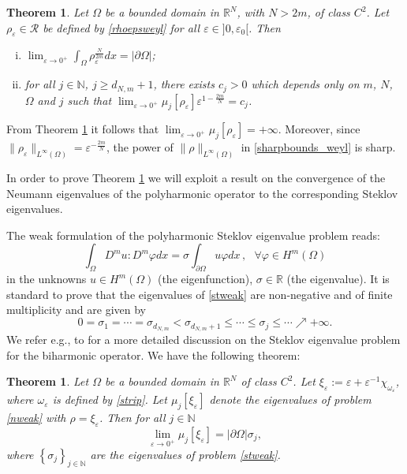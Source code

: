 \documentclass[11pt,a4paper]{amsart}
\numberwithin{equation}{section}
\newtheorem{thm}[equation]{Theorem}
\begin{document}
\begin{thm}\label{counterweyl23}
Let $\Omega$ be a bounded domain in $\mathbb R^N$, with $N>2m$, of class $C^2$. Let $\rho_{\varepsilon}\in\mathcal R$ be defined by \eqref{rhoepsweyl} for all $\varepsilon\in]0,\varepsilon_0[$. Then
\begin{enumerate}[i)]
\item $\lim_{\varepsilon\rightarrow 0^+}\int_{\Omega}\rho_{\varepsilon}^{\frac{N}{2m}}dx=|\partial\Omega|$;
\item for all $j\in\mathbb N$, $j\geq d_{N,m}+1$, there exists $c_j>0$ which depends only on $m$, $N$, $\Omega$ and $j$ such that $\lim_{\varepsilon\rightarrow 0^+}\mu_j[\rho_{\varepsilon}]\varepsilon^{1-\frac{2m}{N}}=c_j$.
\end{enumerate}
\end{thm}

From Theorem \ref{counterweyl23} it follows that $\lim_{\varepsilon\rightarrow 0^+}\mu_j[\rho_{\varepsilon}]=+\infty$. Moreover, since $\|\rho_{\varepsilon}\|_{L^{\infty}(\Omega)}=\varepsilon^{-\frac{2m}{N}}$, the power of $\|\rho\|_{L^{\infty}(\Omega)}$ in \eqref{sharpbounds_weyl} is sharp.


In order to prove Theorem \ref{counterweyl23} we will exploit a result on the convergence of the Neumann eigenvalues of the polyharmonic operator to the corresponding Steklov eigenvalues.

The weak formulation of the polyharmonic Steklov eigenvalue problem  reads:
\begin{equation}\label{stweak}
\int_{\Omega}D^mu:D^m\varphi dx=\sigma\int_{\partial\Omega} u \varphi dx\,,\ \ \ \forall\varphi\in H^m(\Omega)
\end{equation}
in the unknowns $u\in H^m(\Omega)$ (the eigenfunction), $\sigma\in\mathbb R$ (the eigenvalue). It is standard to prove that the eigenvalues of \eqref{stweak} are non-negative and of finite multiplicity and are given by
$$
0=\sigma_1=\cdots=\sigma_{d_{N,m}}<\sigma_{d_{N,m}+1}\leq\cdots\leq\sigma_j\leq\cdots\nearrow +\infty.
$$
We refer e.g., to \cite{buosoprovenzano} for a more detailed discussion on the Steklov eigenvalue problem for the biharmonic operator. We have the following theorem:

\begin{thm}\label{Neumann-to-Steklov}
Let $\Omega$ be a bounded domain in $\mathbb R^N$ of class $C^2$. Let $\xi_{\varepsilon}:=\varepsilon+\varepsilon^{-1}\chi_{\omega_{\varepsilon}}$, where $\omega_{\varepsilon}$ is defined by \eqref{strip}. Let $\mu_j[\xi_{\varepsilon}]$ denote the eigenvalues of problem \eqref{nweak} with $\rho=\xi_{\varepsilon}$. Then for all $j\in\mathbb N$
\begin{equation*}%
\lim_{\varepsilon\rightarrow 0^+}\mu_j[\xi_{\varepsilon}]=|\partial\Omega|\sigma_j,
\end{equation*}
where $\left\{\sigma_j\right\}_{j\in\mathbb N}$ are the eigenvalues of problem \eqref{stweak}.
\end{thm}
 
\end{document}
